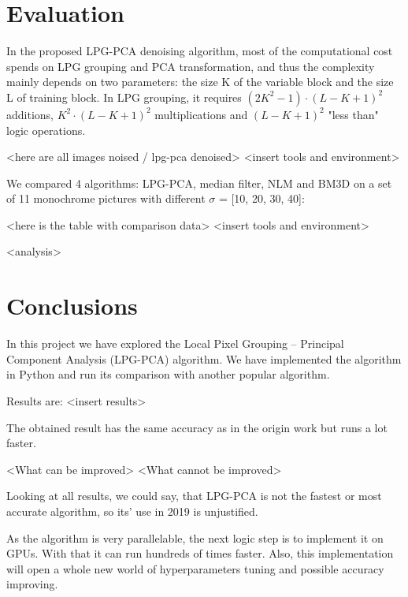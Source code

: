 \section{Evaluation}
In the proposed LPG-PCA denoising algorithm, most of the computational cost spends on LPG grouping and PCA transformation, and thus the complexity mainly depends on two parameters: the size K of the variable block and the size L of training block. In LPG grouping, it requires $(2K^2−1) \cdot (L−K+1)^2$ additions, $K^2 \cdot (L−K+1)^2$ multiplications and $(L−K+1)^2$ "less than" logic operations. \cite{zhang2010two} 

<here are all images noised / lpg-pca denoised> 
<insert tools and environment> 

We compared 4 algorithms: LPG-PCA, median filter, NLM and BM3D on a set of 11 monochrome pictures with different $\sigma$ = [10, 20, 30, 40]: 

<here is the table with comparison data> 
<insert tools and environment> 

<analysis>
\section{Conclusions}
In this project we have explored the Local Pixel Grouping – Principal Component Analysis (LPG-PCA) algorithm. We have implemented the algorithm in Python and run its comparison with another popular algorithm. 

Results are: <insert results> 

The obtained result has the same accuracy as in the origin work but runs a lot faster. 

<What can be improved> 
<What cannot be improved> 

Looking at all results, we could say, that LPG-PCA is not the fastest or most accurate algorithm, so its’ use in 2019 is unjustified.

As the algorithm is very parallelable, the next logic step is to implement it on GPUs. With that it can run hundreds of times faster. Also, this implementation will open a whole new world of hyperparameters tuning and possible accuracy improving. 



